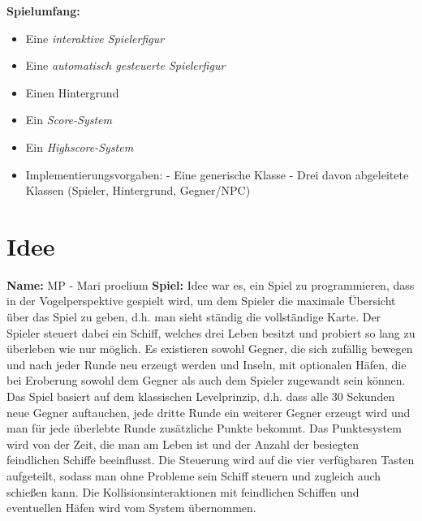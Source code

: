 \documentclass{article}
\begin{document}
\textbf{Spielumfang:}
\begin{itemize}
    \item Eine \textit{interaktive Spielerfigur}
    \item Eine \textit{automatisch gesteuerte Spielerfigur}
    \item Einen Hintergrund
    \item Ein \textit{Score-System}
    \item Ein \textit{Highscore-System}
    \item Implementierungsvorgaben:
        \newline - Eine generische Klasse
        \newline - Drei davon abgeleitete Klassen (Spieler, Hintergrund, Gegner/NPC)
\end{itemize}
\newpage

\section{Idee}
\textbf{Name:}
\newline
MP - Mari proelium
\newline
\textbf{Spiel:}
\newline
Idee war es, ein Spiel zu programmieren, dass in der Vogelperspektive gespielt wird, um dem Spieler die maximale Übersicht über das Spiel zu geben, d.h. man sieht ständig die vollständige Karte.
\newline
Der Spieler steuert dabei ein Schiff, welches drei Leben besitzt und probiert so lang zu überleben wie nur möglich. Es existieren sowohl Gegner, die sich zufällig bewegen und nach jeder Runde neu erzeugt werden und Inseln, mit optionalen Häfen, die bei Eroberung sowohl dem Gegner als auch dem Spieler zugewandt sein können.
\newline
Das Spiel basiert auf dem klassischen Levelprinzip, d.h. dass alle 30 Sekunden neue Gegner auftauchen, jede dritte Runde ein weiterer Gegner erzeugt wird und man für jede überlebte Runde zusätzliche Punkte bekommt. 
\newline
Das Punktesystem wird von der Zeit, die man am Leben ist und der Anzahl der besiegten feindlichen Schiffe beeinflusst.
\newline
Die Steuerung wird auf die vier verfügbaren Tasten aufgeteilt, sodass man ohne Probleme sein Schiff steuern und zugleich auch schießen kann. Die Kollisionsinteraktionen mit feindlichen Schiffen und eventuellen Häfen wird vom System übernommen.
\newpage
\end{document}
